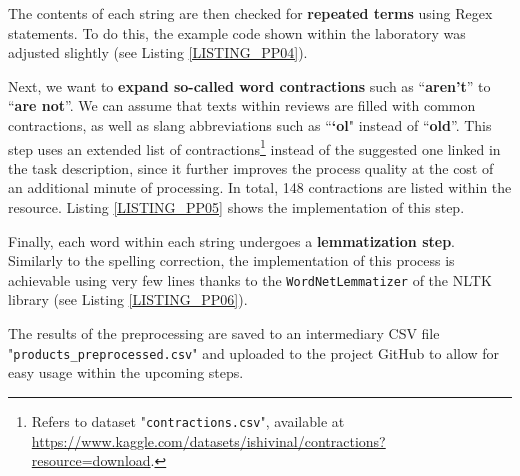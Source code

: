 
\newpage

\noindent
The contents of each string are then checked for \textbf{repeated terms} using Regex statements. To do this, the example code shown within the laboratory was adjusted slightly (see Listing \ref{LISTING_PP04}).


\hspace{1em}

Next, we want to \textbf{expand so-called word contractions} such as “\textbf{aren’t}” to “\textbf{are not}”. We can assume that texts within reviews are filled with common contractions, as well as slang abbreviations such as “\textbf{‘ol}" instead of “\textbf{old}”. This step uses an extended list of contractions\footnote{Refers to dataset "\texttt{contractions.csv}", available at \url{https://www.kaggle.com/datasets/ishivinal/contractions?resource=download}.} instead of the suggested one linked in the task description, since it further improves the process quality at the cost of an additional minute of processing. In total, 148 contractions are listed within the resource. Listing \ref{LISTING_PP05} shows the implementation of this step.


\newpage

\noindent
Finally, each word within each string undergoes a \textbf{lemmatization step}. Similarly to the spelling correction, the implementation of this process is achievable using very few lines thanks to the \texttt{WordNetLemmatizer} of the NLTK library (see Listing \ref{LISTING_PP06}).


\hspace{1em}

The results of the preprocessing are saved to an intermediary CSV file "\texttt{products\_preprocessed.csv}" and uploaded to the project GitHub to allow for easy usage within the upcoming steps.